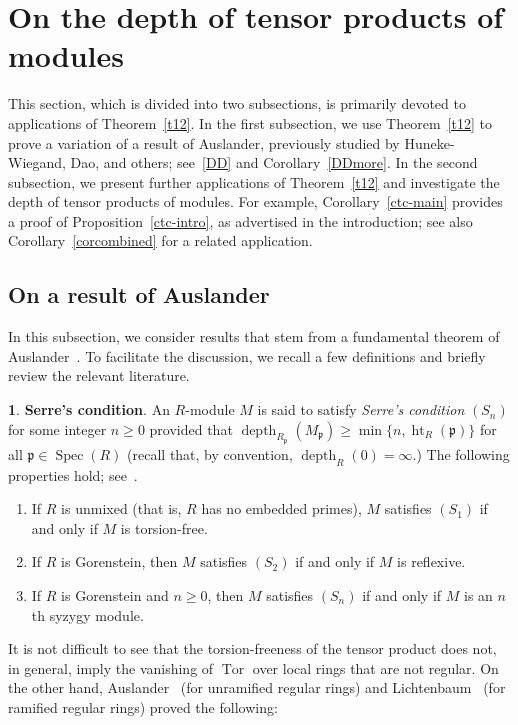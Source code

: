 \documentclass[11pt]{amsart}
\theoremstyle{definition}
\theoremstyle{definition}
\newtheorem{chunk}[thm]{\hspace*{-1.065ex}\bf}
\numberwithin{equation}{section}
\newcommand{\fp}{\mathfrak{p}}
\DeclareMathOperator{\depth}{depth}
\DeclareMathOperator{\Ht}{ht}
\DeclareMathOperator{\Spec}{Spec}
\DeclareMathOperator{\Tor}{Tor}
\begin{document}
\section{On the depth of tensor products of modules}\label{section4}

This section, which is divided into two subsections, is primarily devoted to applications of Theorem~\ref{t12}. In the first subsection, we use Theorem~\ref{t12} to prove a variation of a result of Auslander, previously studied by Huneke-Wiegand, Dao, and others; see~\ref{DD} and Corollary~\ref{DDmore}. In the second subsection, we present further applications of Theorem~\ref{t12} and investigate the depth of tensor products of modules. For example, Corollary~\ref{ctc-main} provides a proof of Proposition~\ref{ctc-intro}, as advertised in the introduction; see also Corollary~\ref{corcombined} for a related application.


\subsection*{On a result of Auslander} In this subsection, we consider results that stem from a fundamental theorem of Auslander~\cite{Au}. To facilitate the discussion, we recall a few definitions and briefly review the relevant literature.

\begin{chunk}{\bf Serre's condition}. \label{SL} An $R$-module $M$ is said to satisfy \emph{Serre's condition} $(S_n)$ for some integer $n\geq 0$ provided that $\depth_{R_{\fp}}(M_\fp)\geq\min\{n,\Ht_R(\fp)\}$ for all $\fp\in\Spec(R)$ (recall that, by convention, $\depth_R(0)=\infty$.) The following properties hold; see~\cite[3.6]{EG}.
\begin{enumerate}[\rm(i)]
\item If $R$ is unmixed (that is, $R$ has no embedded primes), $M$ satisfies $(S_1)$ if and only if $M$ is torsion-free. 
\item If $R$ is Gorenstein, then $M$ satisfies $(S_2)$ if and only if $M$ is reflexive.
\item If $R$ is Gorenstein and $n\geq 0$, then $M$ satisfies $(S_n)$ if and only if $M$ is an $n$th syzygy module.
\end{enumerate}
\end{chunk}

It is not difficult to see that the torsion-freeness of the tensor product does not, in general, imply the vanishing of $\Tor$ over local rings that are not regular. On the other hand, Auslander~\cite{Au} (for unramified regular rings) and Lichtenbaum~\cite{Li} (for ramified regular rings) proved the following:
\end{document}
